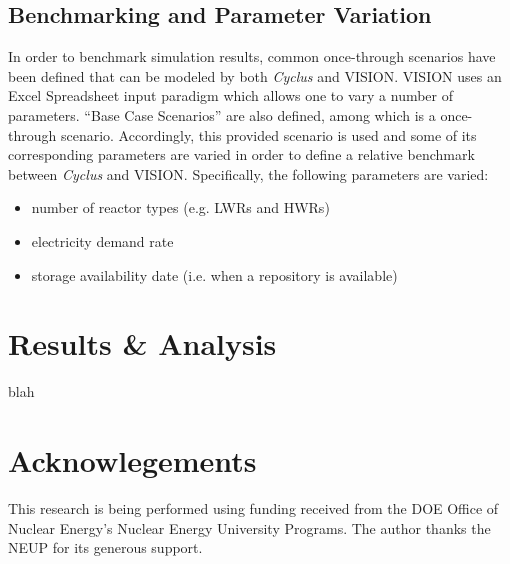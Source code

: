\documentclass{anstrans}
\begin{document}
\subsection{Benchmarking and Parameter Variation}
In order to benchmark simulation results, common once-through scenarios have been defined that can be modeled by both \emph{Cyclus} and VISION. VISION uses an Excel 
Spreadsheet input paradigm which allows one to vary a number of parameters. ``Base Case Scenarios'' are also defined, among which is a once-through scenario.
Accordingly, this provided scenario is used and some of its corresponding parameters are varied in order to define a relative benchmark between \emph{Cyclus} and
VISION. Specifically, the following parameters are varied:
\begin{itemize}
\item number of reactor types (e.g. LWRs and HWRs)
\item electricity demand rate
\item storage availability date (i.e. when a repository is available)
\end{itemize}
\section{Results \& Analysis}
blah
\section{Acknowlegements}
This research is being performed using funding received from the DOE Office of Nuclear Energy's Nuclear Energy University Programs. 
The author thanks the NEUP for its generous support.

\end{document}
